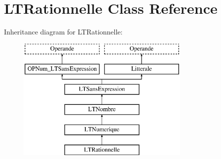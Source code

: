 \hypertarget{class_l_t_rationnelle}{}\section{L\+T\+Rationnelle Class Reference}
\label{class_l_t_rationnelle}
Inheritance diagram for L\+T\+Rationnelle\+:\begin{figure}[H]
\begin{center}
\leavevmode
\includegraphics[height=6.000000cm]{class_l_t_rationnelle}
\end{center}
\end{figure}
